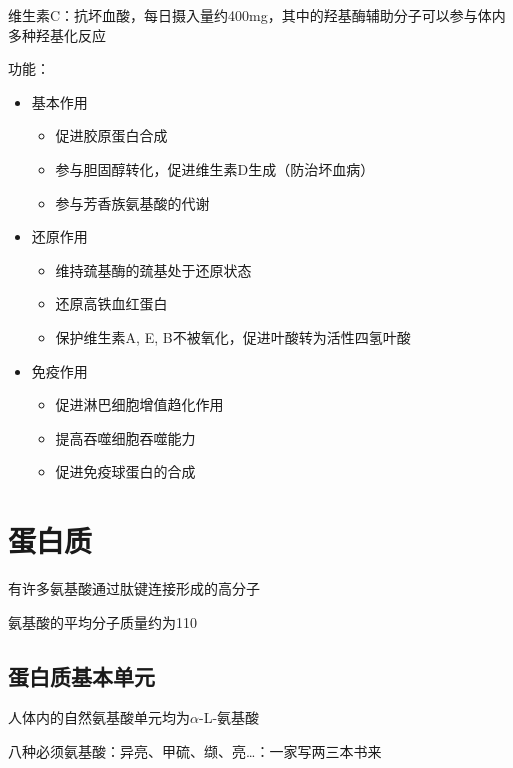 \begin{notation}
    维生素C：抗坏血酸，每日摄入量约400mg，其中的羟基酶辅助分子可以参与体内多种羟基化反应

    功能：
    \begin{itemize}
        \item 基本作用
            \begin{itemize}
                \item 促进胶原蛋白合成
                \item 参与胆固醇转化，促进维生素D生成（防治坏血病）
                \item 参与芳香族氨基酸的代谢
            \end{itemize}
        \item 还原作用
            \begin{itemize}
                \item 维持巯基酶的巯基处于还原状态
                \item 还原高铁血红蛋白
                \item 保护维生素A, E, B不被氧化，促进叶酸转为活性四氢叶酸
            \end{itemize}
        \item 免疫作用
            \begin{itemize}
                \item 促进淋巴细胞增值趋化作用
                \item 提高吞噬细胞吞噬能力
                \item 促进免疫球蛋白的合成
            \end{itemize}
        
    \end{itemize}
\end{notation}
\section{蛋白质}%
\label{sec:蛋白质}
\begin{defi}
    有许多氨基酸通过肽键连接形成的高分子
\end{defi}
\begin{notation}
    氨基酸的平均分子质量约为110
\end{notation}
\subsection{蛋白质基本单元}%
\label{sub:蛋白质基本单元}
人体内的自然氨基酸单元均为$\alpha$-L-氨基酸
\begin{notation}
    八种必须氨基酸：异亮、甲硫、缬、亮\ldots ：一家写两三本书来
\end{notation}

